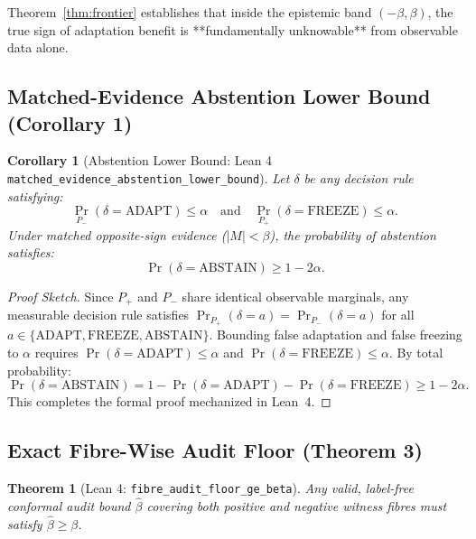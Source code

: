 \documentclass[10pt]{article}
\newtheorem{theorem}{Theorem}
\newtheorem{corollary}{Corollary}
\begin{document}
Theorem~\ref{thm:frontier} establishes that inside the epistemic band $(-\beta, \beta)$, the true sign of adaptation benefit is **fundamentally unknowable** from observable data alone.

\subsection{Matched-Evidence Abstention Lower Bound (Corollary 1)}
\begin{corollary}[Abstention Lower Bound: Lean 4 \texttt{matched\_evidence\_abstention\_lower\_bound}]
Let $\delta$ be any decision rule satisfying:
\begin{equation}
\Pr_{P_-}(\delta = \mathrm{ADAPT}) \le \alpha \quad \text{and} \quad \Pr_{P_+}(\delta = \mathrm{FREEZE}) \le \alpha.
\end{equation}
Under matched opposite-sign evidence ($|M| < \beta$), the probability of abstention satisfies:
\begin{equation}
\Pr(\delta = \mathrm{ABSTAIN}) \ge 1 - 2\alpha.
\end{equation}
\end{corollary}

\begin{proof}[Proof Sketch]
Since $P_+$ and $P_-$ share identical observable marginals, any measurable decision rule satisfies $\Pr_{P_+}(\delta = a) = \Pr_{P_-}(\delta = a)$ for all $a \in \{\mathrm{ADAPT}, \mathrm{FREEZE}, \mathrm{ABSTAIN}\}$. Bounding false adaptation and false freezing to $\alpha$ requires $\Pr(\delta = \mathrm{ADAPT}) \le \alpha$ and $\Pr(\delta = \mathrm{FREEZE}) \le \alpha$. By total probability:
\begin{equation}
\Pr(\delta = \mathrm{ABSTAIN}) = 1 - \Pr(\delta = \mathrm{ADAPT}) - \Pr(\delta = \mathrm{FREEZE}) \ge 1 - 2\alpha.
\end{equation}
This completes the formal proof mechanized in Lean~4.
\end{proof}

\subsection{Exact Fibre-Wise Audit Floor (Theorem 3)}
\begin{theorem}[Lean 4: \texttt{fibre\_audit\_floor\_ge\_beta}]
Any valid, label-free conformal audit bound $\hat{\beta}$ covering both positive and negative witness fibres must satisfy $\hat{\beta} \ge \beta$.
\end{theorem}
\end{document}

